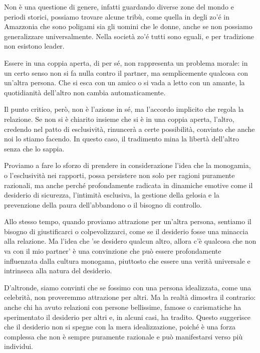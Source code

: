 \documentclass[12pt]{book} %
\begin{document}
Non è una questione di genere, infatti guardando diverse zone del mondo e periodi storici, possiamo trovare alcune
tribù, come quella in degli zo'é in Amazzonia che sono poligami sia gli uomini che le donne, anche se non possiamo generalizzare universalmente. Nella
società zo'é tutti sono eguali, e per tradizione non esistono leader.

Essere in una coppia aperta, di per sé, non rappresenta un problema morale: in un certo senso non si fa nulla contro il partner, ma semplicemente qualcosa con un’altra persona. Che si esca con un amico o si vada a letto con un amante, la quotidianità dell’altro non cambia automaticamente.

Il punto critico, però, non è l’azione in sé, ma l’accordo implicito che regola la relazione. Se non si è chiarito insieme che si è in una coppia aperta, l'altro, credendo nel patto di esclusività, rinuncerà a certe possibilità, convinto che anche noi lo stiamo facendo. In questo caso, il tradimento mina la libertà dell’altro senza che lo sappia.

Proviamo a fare lo sforzo di prendere in considerazione l'idea che la monogamia, o l'esclusività nei rapporti, possa persistere non solo per ragioni puramente razionali, ma anche perché profondamente radicata in dinamiche emotive come il desiderio di sicurezza, l'intimità esclusiva, la gestione della gelosia e la prevenzione della paura dell'abbandono o il bisogno di controllo.

Allo stesso tempo, quando proviamo attrazione per un’altra persona, sentiamo il bisogno di giustificarci o colpevolizzarci, come se il desiderio fosse una minaccia alla relazione. Ma l'idea che 'se desidero qualcun altro, allora c'è qualcosa che non va con il mio partner' è una convinzione che può essere profondamente influenzata dalla cultura monogama, piuttosto che essere una verità universale e intrinseca alla natura del desiderio.

D’altronde, siamo convinti che se fossimo con una persona idealizzata, come una celebrità, non proveremmo attrazione per altri. Ma la realtà dimostra il contrario: anche chi ha avuto relazioni con persone bellissime, famose o carismatiche ha sperimentato il desiderio per altri e, in alcuni casi, ha tradito. Questo suggerisce che il desiderio non si spegne con la mera idealizzazione, poiché è una forza complessa che non è sempre puramente razionale e può manifestarsi verso più individui.
\end{document}
